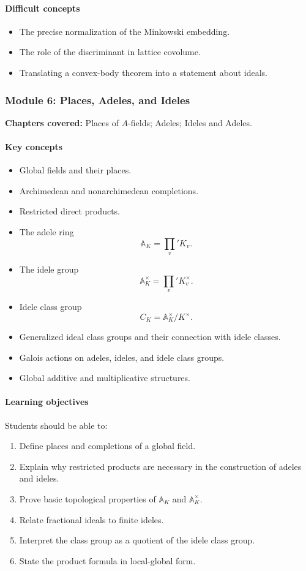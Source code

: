 \documentclass[11pt]{article}
\newcommand{\A}{\mathbb{A}}
\begin{document}
\paragraph{Difficult concepts}
\begin{itemize}
    \item The precise normalization of the Minkowski embedding.
    \item The role of the discriminant in lattice covolume.
    \item Translating a convex-body theorem into a statement about ideals.
\end{itemize}

\subsubsection*{Module 6: Places, Adeles, and Ideles}

\textbf{Chapters covered:} Places of $A$-fields; Adeles; Ideles and Adeles.

\paragraph{Key concepts}
\begin{itemize}
    \item Global fields and their places.
    \item Archimedean and nonarchimedean completions.
    \item Restricted direct products.
    \item The adele ring
    \[
    \A_K = \prod_v' K_v.
    \]
    \item The idele group
    \[
    \A_K^\times = \prod_v' K_v^\times.
    \]
    \item Idele class group
    \[
    C_K=\A_K^\times/K^\times.
    \]
    \item Generalized ideal class groups and their connection with idele classes.
    \item Galois actions on adeles, ideles, and idele class groups.
    \item Global additive and multiplicative structures.
\end{itemize}

\paragraph{Learning objectives}
Students should be able to:
\begin{enumerate}
    \item Define places and completions of a global field.
    \item Explain why restricted products are necessary in the construction of adeles and ideles.
    \item Prove basic topological properties of $\A_K$ and $\A_K^\times$.
    \item Relate fractional ideals to finite ideles.
    \item Interpret the class group as a quotient of the idele class group.
    \item State the product formula in local-global form.
\end{enumerate}
\end{document}
